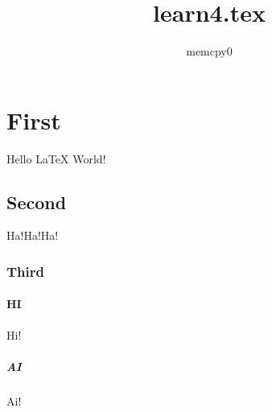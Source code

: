 \documentclass{article}
\author{memcpy0}
\title{learn4.tex}
\begin{document}
    \maketitle
    \tableofcontents
    \section{First}
    Hello LaTeX World!
    \subsection{Second}
    Ha!Ha!Ha!
    \subsubsection{Third}
    \paragraph{HI}
    Hi!
    \subparagraph{AI}
    Ai!
\end{document}
